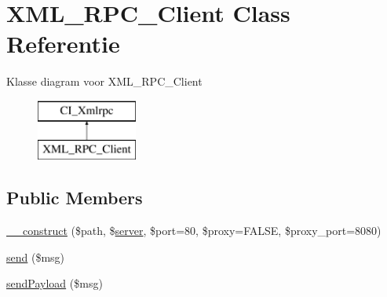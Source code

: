 \hypertarget{class_x_m_l___r_p_c___client}{}\section{X\+M\+L\+\_\+\+R\+P\+C\+\_\+\+Client Class Referentie}
\label{class_x_m_l___r_p_c___client}
Klasse diagram voor X\+M\+L\+\_\+\+R\+P\+C\+\_\+\+Client\begin{figure}[H]
\begin{center}
\leavevmode
\includegraphics[height=2.000000cm]{class_x_m_l___r_p_c___client}
\end{center}
\end{figure}
\subsection*{Public Members}
\begin{DoxyCompactItemize}
\item 
\mbox{\hyperlink{class_x_m_l___r_p_c___client_ab665c9b62c100416c6c1e20ec650f553}{\+\_\+\+\_\+construct}} (\$path, \$\mbox{\hyperlink{class_c_i___xmlrpc_a9969815a7195f6915eb73afcab3f9e9e}{server}}, \$port=80, \$proxy=F\+A\+L\+SE, \$proxy\+\_\+port=8080)
\item 
\mbox{\hyperlink{class_x_m_l___r_p_c___client_a10284ca4704ff9e94185f95baa21973f}{send}} (\$msg)
\item 
\mbox{\hyperlink{class_x_m_l___r_p_c___client_a040f0b8dcbcaac6a33ca0541befed955}{send\+Payload}} (\$msg)
\end{DoxyCompactItemize}

